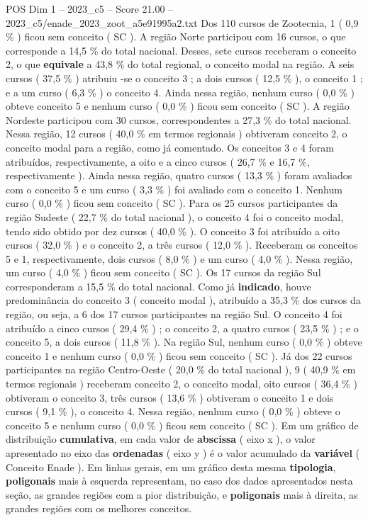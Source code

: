 \begin{textsample}{POS Dim 1 – 2023\_c5 – Score 21.00 – 2023\_c5/enade\_2023\_zoot\_a5e91995a2.txt}
Dos 110 cursos de Zootecnia, 1 ( 0,9 \% ) ficou sem conceito ( SC ).
A região Norte participou com 16 cursos, o que corresponde a 14,5 \% do total nacional.
Desses, sete cursos receberam o conceito 2, o que \textbf{equivale} a 43,8 \% do total regional, o conceito modal na região.
A seis cursos ( 37,5 \% ) atribuiu -se o conceito 3 ; a dois cursos ( 12,5 \% ), o conceito 1 ; e a um curso ( 6,3 \% ) o conceito 4.
Ainda nessa região, nenhum curso ( 0,0 \% ) obteve conceito 5 e nenhum curso ( 0,0 \% ) ficou sem conceito ( SC ).
A região Nordeste participou com 30 cursos, correspondentes a 27,3 \% do total nacional.
Nessa região, 12 cursos ( 40,0 \% em termos regionais ) obtiveram conceito 2, o conceito modal para a região, como já comentado.
Os conceitos 3 e 4 foram atribuídos, respectivamente, a oito e a cinco cursos ( 26,7 \% e 16,7 \%, respectivamente ).
Ainda nessa região, quatro cursos ( 13,3 \% ) foram avaliados com o conceito 5 e um curso ( 3,3 \% ) foi avaliado com o conceito 1.
Nenhum curso ( 0,0 \% ) ficou sem conceito ( SC ).
Para os 25 cursos participantes da região Sudeste ( 22,7 \% do total nacional ), o conceito 4 foi o conceito modal, tendo sido obtido por dez cursos ( 40,0 \% ).
O conceito 3 foi atribuído a oito cursos ( 32,0 \% ) e o conceito 2, a três cursos ( 12,0 \% ).
Receberam os conceitos 5 e 1, respectivamente, dois cursos ( 8,0 \% ) e um curso ( 4,0 \% ).
Nessa região, um curso ( 4,0 \% ) ficou sem conceito ( SC ).
Os 17 cursos da região Sul corresponderam a 15,5 \% do total nacional.
Como já \textbf{indicado}, houve predominância do conceito 3 ( conceito modal ), atribuído a 35,3 \% dos cursos da região, ou seja, a 6 dos 17 cursos participantes na região Sul.
O conceito 4 foi atribuído a cinco cursos ( 29,4 \% ) ; o conceito 2, a quatro cursos ( 23,5 \% ) ; e o conceito 5, a dois cursos ( 11,8 \% ).
Na região Sul, nenhum curso ( 0,0 \% ) obteve conceito 1 e nenhum curso ( 0,0 \% ) ficou sem conceito ( SC ).
Já dos 22 cursos participantes na região Centro-Oeste ( 20,0 \% do total nacional ), 9 ( 40,9 \% em termos regionais ) receberam conceito 2, o conceito modal, oito cursos ( 36,4 \% ) obtiveram o conceito 3, três cursos ( 13,6 \% ) obtiveram o conceito 1 e dois cursos ( 9,1 \% ), o conceito 4.
Nessa região, nenhum curso ( 0,0 \% ) obteve o conceito 5 e nenhum curso ( 0,0 \% ) ficou sem conceito ( SC ).
Em um gráfico de distribuição \textbf{cumulativa}, em cada valor de \textbf{abscissa} ( eixo x ), o valor apresentado no eixo das \textbf{ordenadas} ( eixo y ) é o valor acumulado da \textbf{variável} ( Conceito Enade ).
Em linhas gerais, em um gráfico desta mesma \textbf{tipologia}, \textbf{poligonais} mais à esquerda representam, no caso dos dados apresentados nesta seção, as grandes regiões com a pior distribuição, e \textbf{poligonais} mais à direita, as grandes regiões com os melhores conceitos.

\end{textsample}
